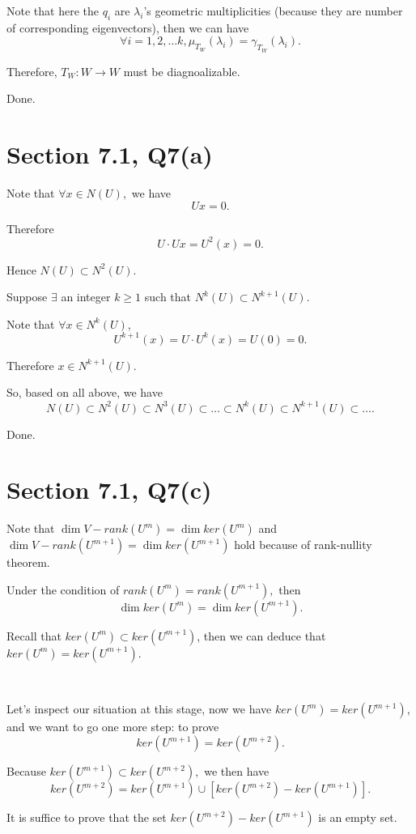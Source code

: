 \documentclass[12pt]{article}%
\begin{document}
Note that here the $q_i$ are $\lambda_i$'s geometric multiplicities (because they are number of corresponding eigenvectors), then we can have $$\forall i=1,2,\dots k, \mu_{T_{W}}(\lambda_i)=\gamma_{T_{W}}(\lambda_i). $$

Therefore, $T_W:W \to W$ must be diagnoalizable.

Done.

\section{Section 7.1, Q7(a)}

Note that $\forall x\in N(U),$ we have $$Ux=0.$$ 

Therefore $$U\cdot Ux = U^2(x)=0.$$

Hence $N(U) \subset N^2(U).$

Suppose $\exists$ an integer $k\geq 1$ such that $N^{k}(U) \subset N^{k+1}(U).$

Note that $\forall x \in N^{k}(U)$, $$U^{k+1}(x)=U\cdot U^{k}(x)=U(0)=0.$$

Therefore $x \in N^{k+1}(U).$

So, based on all above, we have $$N(U) \subset N^2(U) \subset N^3(U) \subset \dots \subset N^k(U) \subset N^{k+1}(U) \subset \dots .$$

Done.

\section{Section 7.1, Q7(c)}

Note that $\dim V- rank(U^m)=\dim ker(U^m)$ and $\dim V- rank(U^{m+1})=\dim ker(U^{m+1})$ hold because of rank-nullity theorem.

Under the condition of $rank(U^m)=rank(U^{m+1}),$ then $$\dim ker(U^m)=\dim ker(U^{m+1}).$$

Recall that $ker (U^m) \subset ker(U^{m+1})$, then we can deduce that $ker(U^m)=ker(U^{m+1}).$


~\ 

Let's inspect our situation at this stage, now we have $ker(U^m)=ker(U^{m+1})$, and we want to go one more step: to prove $$ker(U^{m+1})=ker(U^{m+2}).$$

Because $ker(U^{m+1}) \subset ker(U^{m+2}),$ we then have $$ker(U^{m+2}) = ker(U^{m+1}) \cup [ ker(U^{m+2}) - ker(U^{m+1})].$$

It is suffice to prove that the set $ker(U^{m+2}) - ker(U^{m+1})$ is an empty set.


~\ 
\end{document}
